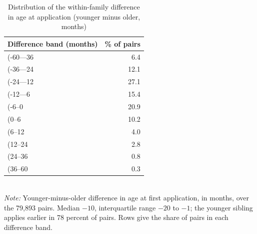 \begin{table}[htbp]\centering
\caption{Distribution of the within-family difference in age at application (younger minus older, months)}
\label{tab:P4dist}
\footnotesize
\setlength{\tabcolsep}{4pt}
\begin{tabular}{lr}
\toprule
Difference band (months) & \% of pairs \\
\midrule
(-60---36 & 6.4 \\
(-36---24 & 12.1 \\
(-24---12 & 27.1 \\
(-12---6 & 15.4 \\
(-6--0 & 20.9 \\
(0--6 & 10.2 \\
(6--12 & 4.0 \\
(12--24 & 2.8 \\
(24--36 & 0.8 \\
(36--60 & 0.3 \\
\bottomrule
\end{tabular}
\\[3pt]{\footnotesize \textit{Note:} Younger-minus-older difference in age at first application, in months, over the 79,893 pairs. Median $-10$, interquartile range $-20$ to $-1$; the younger sibling applies earlier in 78 percent of pairs. Rows give the share of pairs in each difference band.}
\end{table}
